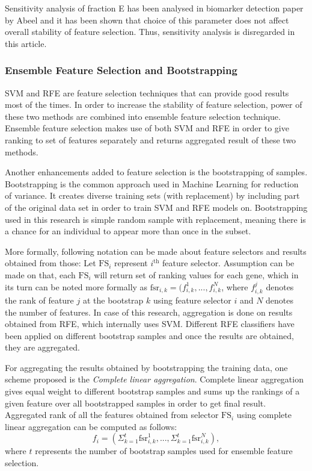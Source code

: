 \documentclass{ba-kecs}
\numberwithin{figure}{section}
\numberwithin{equation}{section}
\begin{document}
Sensitivity analysis of fraction E has been analysed in biomarker detection paper by Abeel \cite{bootstrapping} and it has been shown that choice of this parameter does not affect overall stability of feature selection. Thus, sensitivity analysis is disregarded in this article.



\subsubsection{Ensemble Feature Selection and Bootstrapping}

SVM and RFE are feature selection techniques that can provide good results most of the times. In order to increase the stability of feature selection, power of these two methods are combined into ensemble feature selection technique. Ensemble feature selection makes use of both SVM and RFE in order to give ranking to set of features separately and returns aggregated result of these two methods.

Another enhancements added to feature selection is the bootstrapping of samples. Bootstrapping is the common approach used in Machine Learning for reduction of variance. It creates diverse training sets (with replacement) by including part of the original data set in order to train SVM and RFE models on. Bootstrapping used in this research is simple random sample with replacement, meaning there is a chance for an individual to appear more than once in the subset. 

More formally, following notation can be made about feature selectors and results obtained from those: Let $\mathrm{FS}_{i}$ represent $i^{\mathrm{th}}$ feature selector. Assumption can be made on that, each $\mathrm{FS}_{i}$ will return set of ranking values for each gene, which in its turn can be noted more formally as $\mathrm{fsr}_{i,k} = (f_{i,k}^{1},...,f_{i,k}^{N}$, where $f_{i,k}^{j}$ denotes the rank of feature $j$ at the bootstrap $k$ using feature selector $i$ and $N$ denotes the number of features. In case of this research, aggregation is done on results obtained from RFE, which internally uses SVM. Different RFE classifiers have been applied on different bootstrap samples and once the results are obtained, they are aggregated. 

For aggregating the results obtained by bootstrapping the training data, one scheme proposed is the \textit{Complete linear aggregation}. Complete linear aggregation gives equal weight to different bootstrap samples and sums up the rankings of a given feature over all bootstrapped samples in order to get final result. Aggregated rank of all the features obtained from selector $\mathrm{FS}_{i}$ using complete linear aggregation can be computed as follows:
\begin{equation}
f_{i} = (\Sigma_{k = 1}^{t} \mathrm{fsr}_{i,k}^{1},...,\Sigma_{k = 1}^{t} \mathrm{fsr}_{i,k}^{N}),
\end{equation}
where $t$ represents the number of bootstrap samples used for ensemble feature selection. 
\end{document}
